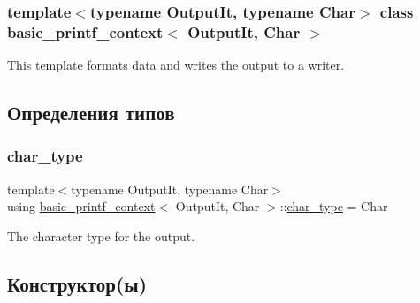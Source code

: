 \subsubsection*{template$<$typename Output\+It, typename Char$>$\newline
class basic\+\_\+printf\+\_\+context$<$ Output\+It, Char $>$}

This template formats data and writes the output to a writer. 

\subsection{Определения типов}
\mbox{\label{classbasic__printf__context_a5ceea5767a393451e5a82b2b75a6f63e}} 
\subsubsection{\texorpdfstring{char\+\_\+type}{char\_type}}
{\footnotesize\ttfamily template$<$typename Output\+It, typename Char$>$ \\
using \hyperlink{classbasic__printf__context}{basic\+\_\+printf\+\_\+context}$<$ Output\+It, Char $>$\+::\hyperlink{classbasic__printf__context_a5ceea5767a393451e5a82b2b75a6f63e}{char\+\_\+type} =  Char}

The character type for the output. 

\subsection{Конструктор(ы)}
\mbox{\label{classbasic__printf__context_a70fcf45d0076835d464b8f3fb0cd4e1c}} 
